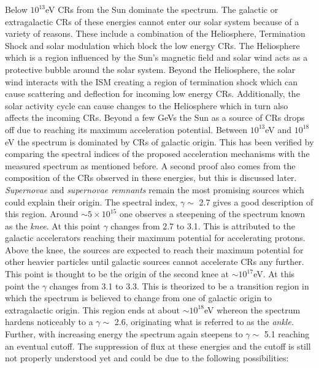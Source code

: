 Below $10^{13}$eV \glspl{CR} from the Sun dominate the spectrum. The galactic or extragalactic \glspl{CR} of these energies cannot enter our solar system because of a variety of reasons. These include a combination of the Heliosphere, Termination Shock and solar modulation which block the low energy \glspl{CR}. The Heliosphere which is a region influenced by the Sun's magnetic field and solar wind acts as a protective bubble around the solar system. Beyond the Heliosphere, the solar wind interacts with the ISM creating a region of termination shock which can cause scattering and deflection for incoming low energy \glspl{CR}. Additionally, the solar activity cycle can cause changes to the Heliosphere which in turn also affects the incoming \glspl{CR}. Beyond a few GeVs the Sun as a source of \glspl{CR} drops off due to reaching its maximum acceleration potential. Between $10^{13}$eV and $10^{18}$eV the spectrum is dominated by \glspl{CR} of galactic origin. This has been verified by comparing the spectral indices of the proposed acceleration mechanisms with the measured spectrum as mentioned before. A second proof also comes from the composition of the \glspl{CR} observed in these energies, but this is discussed later. \textit{Supernovae} and \textit{supernovae remnants} remain the most promising sources which could explain their origin. The spectral index, $\gamma \sim$ 2.7 gives a good description of this region. Around $\sim5 \times 10^{15}$ one observes a steepening of the spectrum known as the \textit{knee}. At this point $\gamma$ changes from 2.7 to 3.1. This is attributed to the galactic accelerators reaching their maximum potential for accelerating protons. Above the knee, the sources are expected to reach their maximum potential for other heavier particles until galactic sources cannot accelerate \glspl{CR} any further. This point is thought to be the origin of the second knee at $\sim 10^{17}$eV. At this point the $\gamma$ changes from 3.1 to 3.3. This is theorized to be a transition region in which the spectrum is believed to change from one of galactic origin to extragalactic origin. This region ends at about $\sim 10^{18}$eV whereon the spectrum hardens noticeably to a $\gamma \sim$ 2.6, originating what is referred to as the \textit{ankle}. Further, with increasing energy the spectrum again steepens to $\gamma \sim$ 5.1 reaching an eventual cutoff. The suppression of flux at these energies and the cutoff is still not properly understood yet and could be due to the following possibilities:

